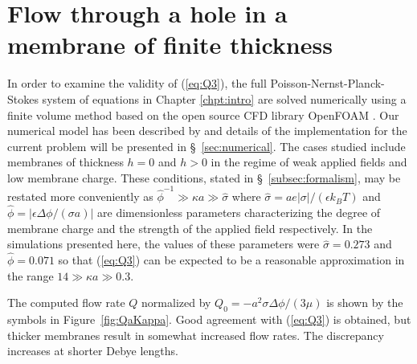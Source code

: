 \section{Flow through a hole in a membrane of finite thickness}
\label{sec:fullSim}
In order to examine the validity of (\ref{eq:Q3}), the full Poisson-Nernst-Planck-Stokes system of equations in Chapter \ref{chpt:intro} are solved numerically using a finite volume method based on the open source CFD library OpenFOAM \cite{OPENFOAM}. Our numerical model has been described by \cite{Mao2013} and details of the implementation for the current problem will be presented in \S~\ref{sec:numerical}. The cases studied include membranes of thickness $h=0$ and $h>0$ in the regime of weak applied fields and low membrane charge. These conditions, stated in \S~\ref{subsec:formalism}, may be restated more conveniently as $ \hat{\phi}^{-1} \gg \kappa a \gg \hat{\sigma}$ where $\hat{\sigma} = a e |\sigma| / (\epsilon k_BT)$ and $\hat{\phi} = |\epsilon\Delta \phi / (\sigma a)|$ are dimensionless parameters characterizing the degree of membrane charge and the strength of the applied field respectively. In the simulations presented here, the values of these parameters were $\hat{\sigma} = 0.273$ and $\hat{\phi}=0.071$ so that (\ref{eq:Q3}) can be expected to be a reasonable approximation in the range $14 \gg \kappa a \gg 0.3$. 

The computed flow rate $Q$ normalized by $Q_{0} =  - a^2 \sigma\Delta\phi/(3\mu)$ is shown 
by the symbols in Figure~\ref{fig:QaKappa}. Good agreement with (\ref{eq:Q3}) is obtained, but  
thicker membranes result in somewhat increased flow rates. The discrepancy increases at 
shorter Debye lengths.  

